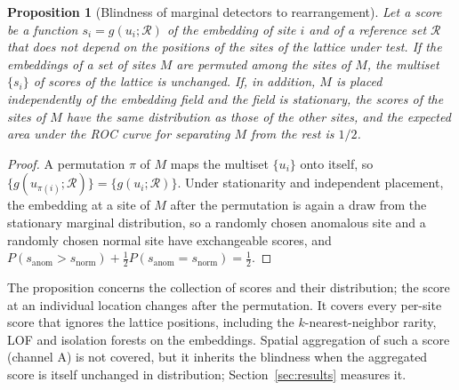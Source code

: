 \documentclass[preprint,review,12pt]{elsarticle}
\newtheorem{proposition}{Proposition}
\begin{document}
\begin{proposition}[Blindness of marginal detectors to rearrangement]
\label{prop:perm}
Let a score be a function $s_i=g(u_i;\mathcal{R})$ of the embedding of site $i$ and of a reference set $\mathcal{R}$ that does not depend on the positions of the sites of the lattice under test. If the embeddings of a set of sites $M$ are permuted among the sites of $M$, the multiset $\{s_i\}$ of scores of the lattice is unchanged. If, in addition, $M$ is placed independently of the embedding field and the field is stationary, the scores of the sites of $M$ have the same distribution as those of the other sites, and the expected area under the ROC curve for separating $M$ from the rest is $1/2$.
\end{proposition}
\begin{proof}
A permutation $\pi$ of $M$ maps the multiset $\{u_i\}$ onto itself, so $\{g(u_{\pi(i)};\mathcal{R})\}=\{g(u_i;\mathcal{R})\}$. Under stationarity and independent placement, the embedding at a site of $M$ after the permutation is again a draw from the stationary marginal distribution, so a randomly chosen anomalous site and a randomly chosen normal site have exchangeable scores, and $P(s_{\mathrm{anom}}>s_{\mathrm{norm}})+\tfrac12P(s_{\mathrm{anom}}=s_{\mathrm{norm}})=\tfrac12$.
\end{proof}
The proposition concerns the collection of scores and their distribution; the score at an individual location changes after the permutation. It covers every per-site score that ignores the lattice positions, including the $k$-nearest-neighbor rarity, LOF \citep{Breunig2000} and isolation forests \citep{Liu2008} on the embeddings. Spatial aggregation of such a score (channel A) is not covered, but it inherits the blindness when the aggregated score is itself unchanged in distribution; Section~\ref{sec:results} measures it.
\end{document}
